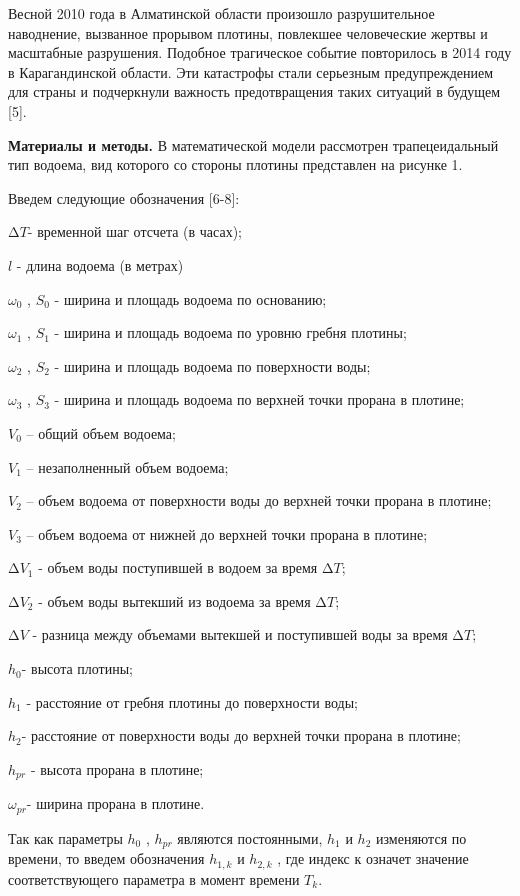 \begin{multicols}{2}
Весной 2010 года в Алматинской области произошло разрушительное
наводнение, вызванное прорывом плотины, повлекшее человеческие жертвы и
масштабные разрушения. Подобное трагическое событие повторилось в 2014
году в Карагандинской области. Эти катастрофы стали серьезным
предупреждением для страны и подчеркнули важность предотвращения таких
ситуаций в будущем {[}5{]}.

{\bfseries Материалы и методы.} В математической модели рассмотрен
трапецеидальный тип водоема, вид которого со стороны плотины представлен
на рисунке 1.

Введем следующие обозначения {[}6-8{]}:

\(\mathrm{\Delta}T\)- временной шаг отсчета (в часах);

\(l\) - длина водоема (в метрах)

\(\omega_{0}\) , \(S_{0}\) - ширина и площадь водоема по основанию;

\(\omega_{1}\) , \(S_{1}\) - ширина и площадь водоема по уровню гребня
плотины;

\(\omega_{2}\) , \(S_{2}\) - ширина и площадь водоема по поверхности
воды;

\(\omega_{3}\) , \(S_{3}\) - ширина и площадь водоема по верхней точки
прорана в плотине;

\(V_{0}\) -- общий объем водоема;

\(V_{1}\) -- незаполненный объем водоема;

\(V_{2}\) -- объем водоема от поверхности воды до верхней точки прорана
в плотине;

\(V_{3}\) -- объем водоема от нижней до верхней точки прорана в плотине;

\(\mathrm{\Delta}V_{1}\) - объем воды поступившей в водоем за время
\(\mathrm{\Delta}T\);

\(\mathrm{\Delta}V_{2}\) - объем воды вытекший из водоема за время
\(\mathrm{\Delta}T\);

\(\mathrm{\Delta}V\) - разница между объемами вытекшей и поступившей
воды за время \(\mathrm{\Delta}T\);

\(h_{0}\)- высота плотины;

\(h_{1}\) - расстояние от гребня плотины до поверхности воды;

\(h_{2}\)- расстояние от поверхности воды до верхней точки прорана в
плотине;

\(h_{pr}\) - высота прорана в плотине;

\(\omega_{pr}\)- ширина прорана в плотине.

Так как параметры \(h_{0}\) , \(h_{pr}\) являются постоянными, \(h_{1}\)
и \(h_{2}\) изменяются по времени, то введем обозначения \(h_{1,k}\) и
\(h_{2,k}\) , где индекс к означет значение соответствующего параметра в
момент времени \(T_{k}\).


\end{multicols}
